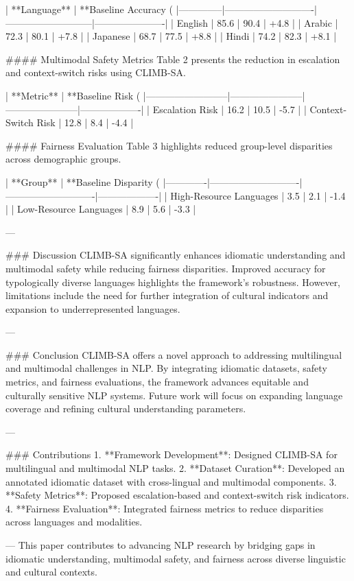 | **Language** | **Baseline Accuracy (%
|--------------|----------------------------|---------------------------|----------------------|
| English      | 85.6                       | 90.4                      | +4.8                |
| Arabic       | 72.3                       | 80.1                      | +7.8                |
| Japanese     | 68.7                       | 77.5                      | +8.8                |
| Hindi        | 74.2                       | 82.3                      | +8.1                |

#### Multimodal Safety Metrics  
Table 2 presents the reduction in escalation and context-switch risks using CLIMB-SA.

| **Metric**               | **Baseline Risk (%
|--------------------------|-----------------------|-----------------------|-------------------|
| Escalation Risk          | 16.2                 | 10.5                  | -5.7              |
| Context-Switch Risk      | 12.8                 | 8.4                   | -4.4              |

#### Fairness Evaluation  
Table 3 highlights reduced group-level disparities across demographic groups.

| **Group**   | **Baseline Disparity (%
|-------------|----------------------------|----------------------------|-------------------|
| High-Resource Languages | 3.5                      | 2.1                      | -1.4              |
| Low-Resource Languages  | 8.9                      | 5.6                      | -3.3              |

---

### Discussion  
CLIMB-SA significantly enhances idiomatic understanding and multimodal safety while reducing fairness disparities. Improved accuracy for typologically diverse languages highlights the framework's robustness. However, limitations include the need for further integration of cultural indicators and expansion to underrepresented languages.

---

### Conclusion  
CLIMB-SA offers a novel approach to addressing multilingual and multimodal challenges in NLP. By integrating idiomatic datasets, safety metrics, and fairness evaluations, the framework advances equitable and culturally sensitive NLP systems. Future work will focus on expanding language coverage and refining cultural understanding parameters.

---

### Contributions  
1. **Framework Development**: Designed CLIMB-SA for multilingual and multimodal NLP tasks.  
2. **Dataset Curation**: Developed an annotated idiomatic dataset with cross-lingual and multimodal components.  
3. **Safety Metrics**: Proposed escalation-based and context-switch risk indicators.  
4. **Fairness Evaluation**: Integrated fairness metrics to reduce disparities across languages and modalities.

---  
This paper contributes to advancing NLP research by bridging gaps in idiomatic understanding, multimodal safety, and fairness across diverse linguistic and cultural contexts.